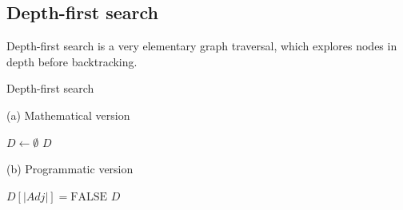\subsection{Depth-first search} \label{algorithm-reachability-dfs}
Depth-first search is a very elementary graph traversal, which explores nodes in depth before backtracking.
\begin{algorithm}[ht]
    \caption{Depth-first search}
    \label{alg-dfs}
    \begin{minipage}[t]{0.49\linewidth}
        (a) Mathematical version
        \begin{algorithmic}[1]
            \State $D \gets \emptyset$
                 \Return {$ $}
                \EndIf 
                \EndFor
                \State \Return $D$
            \EndFunction
        \end{algorithmic}
    \end{minipage}
    \begin{minipage}[t]{0.49\linewidth}
        (b) Programmatic version
        \begin{algorithmic}[1]
            \State $D[|Adj|] = \text{FALSE}$
                 \Return {$ $}
                \EndIf 
                \EndFor
                \State \Return $D$
            \EndFunction
        \end{algorithmic}
    \end{minipage}
\end{algorithm}
